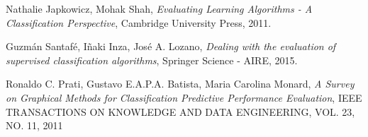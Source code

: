 \begin{thebibliography}{99}

  Nathalie Japkowicz, Mohak Shah,
  \emph{Evaluating Learning Algorithms - A Classification Perspective},
  Cambridge University Press,
  2011.

  Guzmán Santafé, Iñaki Inza, José A. Lozano,
  \emph{Dealing with the evaluation of supervised classification algorithms},
  Springer Science - AIRE,
  2015.
  
  Ronaldo C. Prati, Gustavo E.A.P.A. Batista, Maria Carolina Monard,
  \emph{A Survey on Graphical Methods for Classification Predictive Performance Evaluation},
  IEEE TRANSACTIONS ON KNOWLEDGE AND DATA ENGINEERING, VOL. 23, NO. 11,
  2011
	
  
\end{thebibliography}